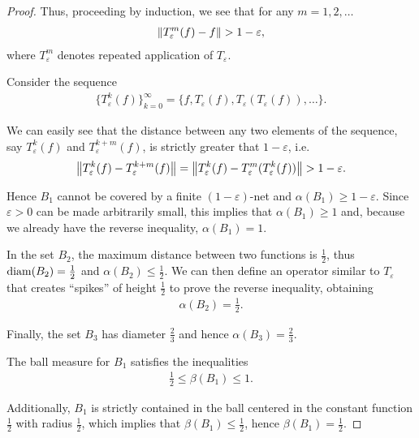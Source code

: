 \begin{proof}
  Thus, proceeding by induction, we see that for any \( m = 1, 2, \ldots \)
  \begin{align*}
    \left\Vert T_\varepsilon^m(f) - f \right\Vert > 1 - \varepsilon,
  \end{align*}
  where \( T_\varepsilon^m \) denotes repeated application of \( T_\varepsilon \).

  Consider the sequence
  \begin{align*}
    \{ T_\varepsilon^k(f) \}_{k=0}^\infty = \{ f, T_\varepsilon(f), T_\varepsilon(T_\varepsilon(f)), \ldots \}.
  \end{align*}

  We can easily see that the distance between any two elements of the sequence, say \( T_\varepsilon^k(f) \) and \( T_\varepsilon^{k+m}(f) \), is strictly greater that \( 1 - \varepsilon \), i.e.
  \begin{align*}
    \left\Vert T_\varepsilon^k(f) - T_\varepsilon^{k+m}(f) \right\Vert
    =
    \left\Vert T_\varepsilon^k(f) - T_\varepsilon^m(T_\varepsilon^k(f)) \right\Vert
    >
    1 - \varepsilon.
  \end{align*}

  Hence \( B_1 \) cannot be covered by a finite \( (1-\varepsilon) \)-net and \( \alpha(B_1) \geq 1 - \varepsilon \). Since \( \varepsilon > 0 \) can be made arbitrarily small, this implies that \( \alpha(B_1) \geq 1 \) and, because we already have the reverse inequality, \( \alpha(B_1) = 1 \).

  In the set \( B_2 \), the maximum distance between two functions is \( \frac 1 2 \), thus \( \operatorname{diam}(B_2) = \frac 1 2 \) and \( \alpha(B_2) \leq \frac 1 2 \). We can then define an operator similar to \( T_\varepsilon \) that creates \enquote{spikes} of height \( \frac 1 2 \) to prove the reverse inequality, obtaining
  \begin{align*}
    \alpha(B_2) = \frac 1 2.
  \end{align*}

  Finally, the set \( B_3 \) has diameter \( \frac 2 3 \) and hence \( \alpha(B_3) = \frac 2 3 \).

  The ball measure for \( B_1 \) satisfies the inequalities
  \begin{align*}
    \frac 1 2 \leq \beta(B_1) \leq 1.
  \end{align*}

  Additionally, \( B_1 \) is strictly contained in the ball centered in the constant function \( \frac 1 2 \) with radius \( \frac 1 2 \), which implies that \( \beta(B_1) \leq \frac 1 2 \), hence \( \beta(B_1) = \frac 1 2 \).


\end{proof}
